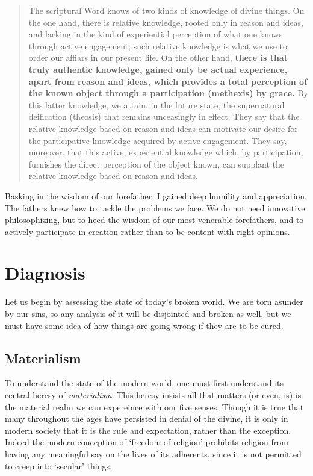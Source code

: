 \documentclass[letterpaper]{article}
\begin{document}
\begin{quote}
  The scriptural Word knows of two kinds of knowledge of divine things. On the one hand, there is relative knowledge, rooted only in reason and ideas, and lacking in the kind of experiential perception of what one knows through active engagement; such relative knowledge is what we use to order our affiars in our present life. On the other hand, \textbf{there is that truly authentic knowledge, gained only be actual experience, apart from reason and ideas, which provides a total perception of the known object through a participation (methexis) by grace.} By this latter knowledge, we attain, in the future state, the supernatural deification (theosis) that remains unceasingly in effect. They say that the relative knowledge based on reason and ideas can motivate our desire for the participative knowledge acquired by active engagement. They say, moreover, that this active, experiential knowledge which, by participation, furnishes the direct perception of the object known, can supplant the relative knowledge based on reason and ideas.
\end{quote}

Basking in the wisdom of our forefather, I gained deep humility and appreciation. The fathers knew how to tackle the problems we face. We do not need innovative philosophizing, but to heed the wisdom of our most venerable forefathers, and to actively participate in creation rather than to be content with right opinions.
\fi

\section{Diagnosis}

Let us begin by assessing the state of today's broken world. We are torn asunder by our sins, so any analysis of it will be disjointed and broken as well, but we must have some idea of how things are going wrong if they are to be cured.

\subsection{Materialism}

To understand the state of the modern world, one must first understand its central heresy of \textit{materialism}. This heresy insists all that matters (or even, is) is the material realm we can expereince with our five senses. Though it is true that many throughout the ages have persisted in denial of the divine, it is only in modern society that it is the rule and expectation, rather than the exception. Indeed the modern conception of `freedom of religion' prohibits religion from having any meaningful say on the lives of its adherents, since it is not permitted to creep into `secular' things.
\end{document}
